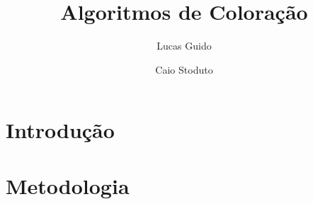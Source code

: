 \documentclass[10pt]{article}
\begin{document}
\title{Algoritmos de Coloração}
\author{Lucas Guido \and Caio Stoduto}
\date{}
\maketitle

\begin{multicols*}{2}
\section{Introdução}
\section{Metodologia}
    
\end{multicols*}
\end{document}
